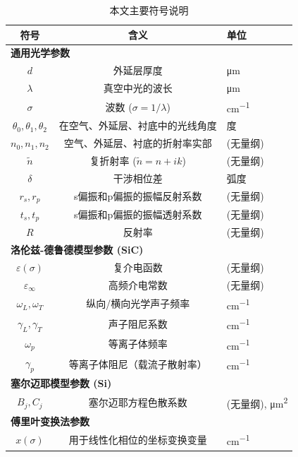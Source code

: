 \documentclass[a4paper]{ctexart}
\begin{document}
\begin{table}[H]
    \centering
    \caption{本文主要符号说明}
    \label{tab:symbols}
    \begin{tabular}{ccl}
        \toprule
        \textbf{符号} & \textbf{含义} & \textbf{单位} \\
        \midrule
        \multicolumn{3}{l}{\textbf{通用光学参数}} \\
        $d$ & 外延层厚度 & \si{\micro\meter} \\
        $\lambda$ & 真空中光的波长 & \si{\micro\meter} \\
        $\sigma$ & 波数 ($\sigma = 1/\lambda$) & \si{cm^{-1}} \\
        $\theta_0, \theta_1, \theta_2$ & 在空气、外延层、衬底中的光线角度 & 度 \\
        $n_0, n_1, n_2$ & 空气、外延层、衬底的折射率实部 & (无量纲) \\
        $\tilde{n}$ & 复折射率 ($\tilde{n}=n+ik$) & (无量纲) \\
        $\delta$ & 干涉相位差 & 弧度 \\
        $r_s, r_p$ & s偏振和p偏振的振幅反射系数 & (无量纲) \\
        $t_s, t_p$ & s偏振和p偏振的振幅透射系数 & (无量纲) \\
        $R$ & 反射率 & (无量纲) \\
        \midrule
        \multicolumn{3}{l}{\textbf{洛伦兹-德鲁德模型参数 (SiC)}} \\
        $\varepsilon(\sigma)$ & 复介电函数 & (无量纲) \\
        $\varepsilon_{\infty}$ & 高频介电常数 & (无量纲) \\
        $\omega_L, \omega_T$ & 纵向/横向光学声子频率 & \si{cm^{-1}} \\
        $\gamma_L, \gamma_T$ & 声子阻尼系数 & \si{cm^{-1}} \\
        $\omega_p$ & 等离子体频率 & \si{cm^{-1}} \\
        $\gamma_p$ & 等离子体阻尼（载流子散射率） & \si{cm^{-1}} \\
        \midrule
        \multicolumn{3}{l}{\textbf{塞尔迈耶模型参数 (Si)}} \\
        $B_j, C_j$ & 塞尔迈耶方程色散系数 & (无量纲), \si{\micro\meter^2} \\
        \midrule
        \multicolumn{3}{l}{\textbf{傅里叶变换法参数}} \\
        $x(\sigma)$ & 用于线性化相位的坐标变换变量 & \si{cm^{-1}} \\
        \bottomrule
    \end{tabular}
\end{table}
\end{document}
